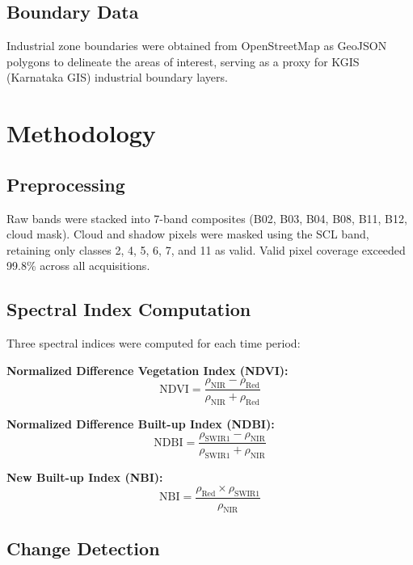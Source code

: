 \documentclass[conference,10pt]{IEEEtran}
\begin{document}
\subsection{Boundary Data}

Industrial zone boundaries were obtained from OpenStreetMap as GeoJSON polygons to delineate the areas of interest, serving as a proxy for KGIS (Karnataka GIS) industrial boundary layers.

\section{Methodology}

\subsection{Preprocessing}

Raw bands were stacked into 7-band composites (B02, B03, B04, B08, B11, B12, cloud mask). Cloud and shadow pixels were masked using the SCL band, retaining only classes 2, 4, 5, 6, 7, and 11 as valid. Valid pixel coverage exceeded 99.8\% across all acquisitions.

\subsection{Spectral Index Computation}

Three spectral indices were computed for each time period:

\textbf{Normalized Difference Vegetation Index (NDVI):}
\begin{equation}
    \text{NDVI} = \frac{\rho_{\text{NIR}} - \rho_{\text{Red}}}{\rho_{\text{NIR}} + \rho_{\text{Red}}}
\end{equation}

\textbf{Normalized Difference Built-up Index (NDBI):}
\begin{equation}
    \text{NDBI} = \frac{\rho_{\text{SWIR1}} - \rho_{\text{NIR}}}{\rho_{\text{SWIR1}} + \rho_{\text{NIR}}}
\end{equation}

\textbf{New Built-up Index (NBI):}
\begin{equation}
    \text{NBI} = \frac{\rho_{\text{Red}} \times \rho_{\text{SWIR1}}}{\rho_{\text{NIR}}}
\end{equation}

\subsection{Change Detection}
\end{document}
